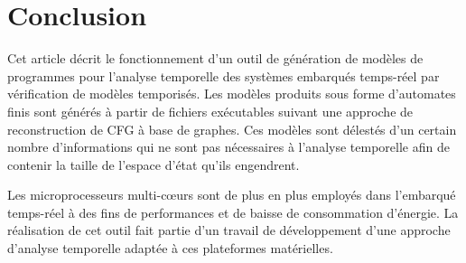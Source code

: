 \section{Conclusion}
\label{sec:conclusion}


  Cet article décrit le fonctionnement d'un outil de génération de modèles de
  programmes pour l'analyse temporelle des systèmes embarqués temps-réel par
  vérification de modèles temporisés. Les modèles produits sous forme
  d'automates finis sont générés à partir de fichiers exécutables suivant une
  approche de reconstruction de CFG à base de graphes. Ces modèles sont délestés
  d'un certain nombre d'informations qui ne sont pas nécessaires à l'analyse
  temporelle afin de contenir la taille de l'espace d'état qu'ils engendrent.


  Les microprocesseurs multi-c{\oe}urs sont de plus en plus employés dans
  l'embarqué temps-réel à des fins de performances et de baisse de consommation
  d'énergie. La réalisation de cet outil fait partie d'un travail de
  développement d'une approche d'analyse temporelle adaptée à ces plateformes
  matérielles.

